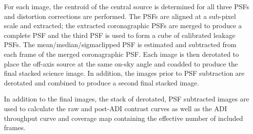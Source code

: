 For each image, the centroid of the central source is determined for
all three PSFs and distortion corrections are performed. The PSFs are
aligned at a sub-pixel scale and extracted; the extracted
coronagraphic PSFs are merged to produce a complete PSF and the third
PSF is used to form a cube of calibrated leakage PSFs.  The
mean/median/sigmaclipped PSF is estimated and subtracted from each
frame of the merged coronagraphic PSF. Each image is then derotated to
place the off-axis source at the same on-sky angle and coadded to
produce the final stacked science image. In addition, the images prior
to PSF subtraction are derotated and combined to produce a second
final stacked image.

In addition to the final images, the stack of derotated, PSF
subtracted images are used to calculate the raw and post-ADI contrast
curves as well as the ADI throughput curve and coverage map containing
the effective number of included frames.






